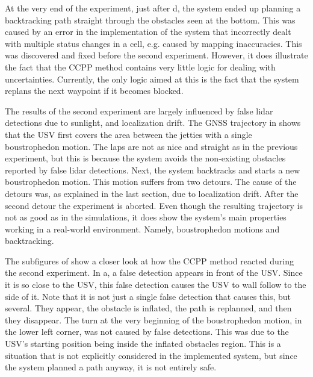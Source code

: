 At the very end of the experiment, just after d, the system ended up planning a backtracking path straight through the obstacles seen at the bottom. This was caused by an error in the implementation of the system that incorrectly dealt with multiple status changes in a cell, e.g. caused by mapping inaccuracies. This was discovered and fixed before the second experiment. However, it does illustrate the fact that the CCPP method contains very little logic for dealing with uncertainties. Currently, the only logic aimed at this is the fact that the system replans the next waypoint if it becomes blocked.

The results of the second experiment are largely influenced by false lidar detections due to sunlight, and localization drift. The GNSS trajectory in  shows that the USV first covers the area between the jetties with a single boustrophedon motion. The laps are not as nice and straight as in the previous experiment, but this is because the system avoids the non-existing obstacles reported by false lidar detections. Next, the system backtracks and starts a new boustrophedon motion. This motion suffers from two detours. The cause of the detours was, as explained in the last section, due to localization drift. After the second detour the experiment is aborted.  Even though the resulting trajectory is not as good as in the simulations, it does show the system's main properties working in a real-world environment. Namely, boustrophedon motions and backtracking.

The subfigures of  show a closer look at how the CCPP method reacted during the second experiment. In a, a false detection appears in front of the USV. Since it is so close to the USV, this false detection causes the USV to wall follow to the side of it. Note that it is not just a single false detection that causes this, but several. They appear, the obstacle is inflated, the path is replanned, and then they disappear. The turn at the very beginning of the boustrophedon motion, in the lower left corner, was not caused by false detections. This was due to the USV's starting position being inside the inflated obstacles region. This is a situation that is not explicitly considered in the implemented system, but since the system planned a path anyway, it is not entirely safe.

